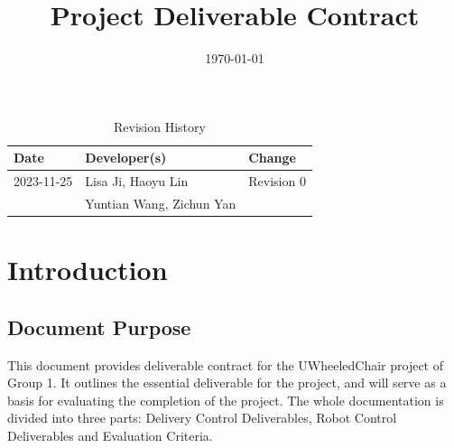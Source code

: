 \documentclass[12pt]{article}
\title{Project Deliverable Contract\\\progname}
\author{\authname}
\date{\today}
\begin{document}
\maketitle
{}

\newpage
\begin{table}[hp]
    \caption{Revision History} \label{TblRevisionHistory}
    \begin{tabularx}{\textwidth}{llX}
        \toprule
        \textbf{Date} & \textbf{Developer(s)}    & \textbf{Change} \\
        \midrule
        2023-11-25    & Lisa Ji, Haoyu Lin       & Revision 0      \\
                      & Yuntian Wang, Zichun Yan &                 \\
        \bottomrule
    \end{tabularx}
\end{table}

\newpage
\tableofcontents
\listoftables
\listoffigures

\printnoidxglossary[type=\acronymtype,style=mystyle,title=Naming Conventions and Terminology]

\newpage
\section{Introduction}
\subsection{Document Purpose} \label{sec:Document Purpose}
This document provides deliverable contract for the UWheeledChair project of Group 1. It outlines the essential deliverable for the project, and will serve as a basis for evaluating the completion of the project. The whole documentation is divided into three parts: Delivery Control Deliverables, Robot Control Deliverables and Evaluation Criteria.
\end{document}
